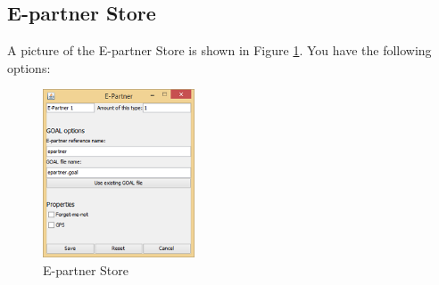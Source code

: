 \subsection{E-partner Store}
A picture of the E-partner Store is shown in Figure \ref{fig:epartnerstore}. You have the following options:

\begin{figure}[h]
\begin{center}
\includegraphics[width=0.4\textwidth]{ScenarioEditor/es.png}
\end{center}
\caption{E-partner Store}
\label{fig:epartnerstore}
\end{figure}

